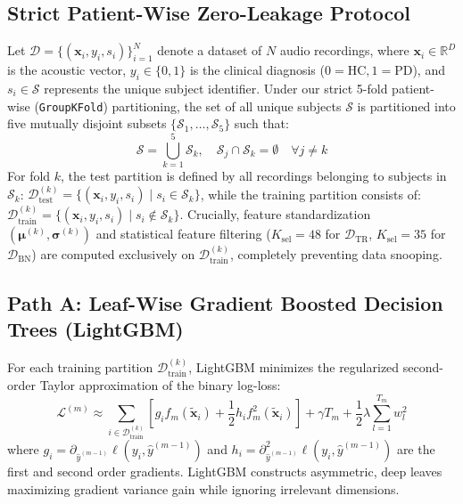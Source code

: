 \documentclass[journal,10pt,twoside]{IEEEtran}
\begin{document}
\subsection{Strict Patient-Wise Zero-Leakage Protocol}
Let $\mathcal{D} = \{(\mathbf{x}_i, y_i, s_i)\}_{i=1}^{N}$ denote a dataset of $N$ audio recordings, where $\mathbf{x}_i \in \mathbb{R}^D$ is the acoustic vector, $y_i \in \{0, 1\}$ is the clinical diagnosis ($0 = \text{HC}, 1 = \text{PD}$), and $s_i \in \mathcal{S}$ represents the unique subject identifier. Under our strict 5-fold patient-wise (\texttt{GroupKFold}) partitioning, the set of all unique subjects $\mathcal{S}$ is partitioned into five mutually disjoint subsets $\{\mathcal{S}_1, \dots, \mathcal{S}_5\}$ such that:
\begin{equation}
\mathcal{S} = \bigcup_{k=1}^5 \mathcal{S}_k, \quad \mathcal{S}_j \cap \mathcal{S}_k = \emptyset \quad \forall j \neq k
\end{equation}
For fold $k$, the test partition is defined by all recordings belonging to subjects in $\mathcal{S}_k$: $\mathcal{D}_{\text{test}}^{(k)} = \{(\mathbf{x}_i, y_i, s_i) \mid s_i \in \mathcal{S}_k\}$, while the training partition consists of: $\mathcal{D}_{\text{train}}^{(k)} = \{(\mathbf{x}_i, y_i, s_i) \mid s_i \notin \mathcal{S}_k\}$. Crucially, feature standardization $(\boldsymbol{\mu}^{(k)}, \boldsymbol{\sigma}^{(k)})$ and statistical feature filtering ($K_{\text{sel}} = 48$ for $\mathcal{D}_{\text{TR}}$, $K_{\text{sel}} = 35$ for $\mathcal{D}_{\text{BN}}$) are computed exclusively on $\mathcal{D}_{\text{train}}^{(k)}$, completely preventing data snooping.

\subsection{Path A: Leaf-Wise Gradient Boosted Decision Trees (LightGBM)}
For each training partition $\mathcal{D}_{\text{train}}^{(k)}$, LightGBM \cite{ref8} minimizes the regularized second-order Taylor approximation of the binary log-loss:
\begin{equation}
\mathcal{L}^{(m)} \approx \sum_{i \in \mathcal{D}_{\text{train}}^{(k)}} \left[ g_i f_m(\tilde{\mathbf{x}}_i) + \frac{1}{2} h_i f_m^2(\tilde{\mathbf{x}}_i) \right] + \gamma T_m + \frac{1}{2}\lambda \sum_{l=1}^{T_m} w_l^2
\end{equation}
where $g_i = \partial_{\hat{y}^{(m-1)}} \ell(y_i, \hat{y}^{(m-1)})$ and $h_i = \partial^2_{\hat{y}^{(m-1)}} \ell(y_i, \hat{y}^{(m-1)})$ are the first and second order gradients. LightGBM constructs asymmetric, deep leaves maximizing gradient variance gain while ignoring irrelevant dimensions.
\end{document}

